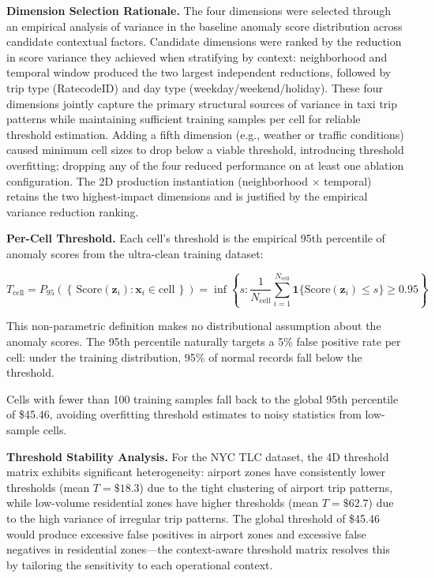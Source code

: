 \textbf{Dimension Selection Rationale.} The four dimensions were selected through an empirical analysis of variance in the baseline anomaly score distribution across candidate contextual factors. Candidate dimensions were ranked by the reduction in score variance they achieved when stratifying by context: neighborhood and temporal window produced the two largest independent reductions, followed by trip type (RatecodeID) and day type (weekday/weekend/holiday). These four dimensions jointly capture the primary structural sources of variance in taxi trip patterns while maintaining sufficient training samples per cell for reliable threshold estimation. Adding a fifth dimension (e.g., weather or traffic conditions) caused minimum cell sizes to drop below a viable threshold, introducing threshold overfitting; dropping any of the four reduced performance on at least one ablation configuration. The 2D production instantiation (neighborhood $\times$ temporal) retains the two highest-impact dimensions and is justified by the empirical variance reduction ranking.

\textbf{Per-Cell Threshold.} Each cell's threshold is the empirical 95th percentile of anomaly scores from the ultra-clean training dataset:

\begin{equation}
T_{\text{cell}} = P_{95}\!\left(\left\{\,\text{Score}(\mathbf{z}_i) : \mathbf{x}_i \in \text{cell}\,\right\}\right)
= \inf\left\{s : \frac{1}{N_{\text{cell}}}\sum_{i=1}^{N_{\text{cell}}} \mathbf{1}\{\text{Score}(\mathbf{z}_i) \leq s\} \geq 0.95\right\}
\label{eq:threshold_p95}
\end{equation}

This non-parametric definition makes no distributional assumption about the anomaly scores. The 95th percentile naturally targets a 5\% false positive rate per cell: under the training distribution, 95\% of normal records fall below the threshold.

Cells with fewer than 100 training samples fall back to the global 95th percentile of \$45.46, avoiding overfitting threshold estimates to noisy statistics from low-sample cells.

\textbf{Threshold Stability Analysis.} For the NYC TLC dataset, the 4D threshold matrix exhibits significant heterogeneity: airport zones have consistently lower thresholds (mean $T = \$18.3$) due to the tight clustering of airport trip patterns, while low-volume residential zones have higher thresholds (mean $T = \$62.7$) due to the high variance of irregular trip patterns. The global threshold of \$45.46 would produce excessive false positives in airport zones and excessive false negatives in residential zones---the context-aware threshold matrix resolves this by tailoring the sensitivity to each operational context.

